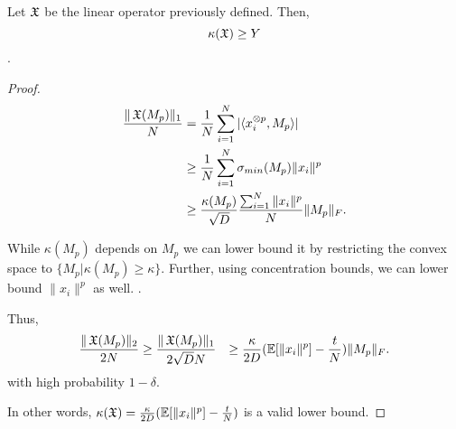 \begin{lemma}
Let $\operatorname{\mathfrak{X}}$ be the linear operator previously defined. Then,
$$\kappa(\operatorname{\mathfrak{X}}) \ge Y$$.
\end{lemma}
\begin{proof}

  \begin{align*}
    \frac{\|\operatorname{\mathfrak{X}}(M_p)\|_1}{N} &= \frac{1}{N}\sum_{i=1}^{N} |\langle x_i^{\otimes p}, M_p \rangle| \\
    &\ge \frac{1}{N}\sum_{i=1}^{N} \sigma_{min}( M_p ) \|x_i\|^p \\
    &\ge \frac{\kappa(M_p)}{\sqrt{D}} \frac{\sum_{i=1}^{N} \|x_i\|^p}{N} \| M_p \|_F.
  \end{align*}

  While $\kappa(M_p)$ depends on $M_p$ we can lower bound it by
  restricting the convex space to $\{ M_p | \kappa(M_p) \ge \kappa \}$.
  Further, using concentration bounds, we can lower bound $\|x_i\|^p$ as
  well. .
  
  Thus, 
  \begin{align*}
  \frac{ \|\operatorname{\mathfrak{X}}(M_p)\|_2 }{2 N} 
  &\ge
  \frac{ \|\operatorname{\mathfrak{X}}(M_p)\|_1 }{2 \sqrt{D}N} 
  &\ge \frac{\kappa}{2 D} (\operatorname{\mathbb{E}}[\|x_i\|^p] - \frac{t}{N}) \| M_p \|_F.
  \end{align*}
  with high probability $1 - \delta$. 
  
  In other words, $\kappa(\operatorname{\mathfrak{X}})
  = \frac{\kappa}{2 D} (\operatorname{\mathbb{E}}[\|x_i\|^p] - \frac{t}{N})$ is a valid
  lower bound.
\end{proof}


